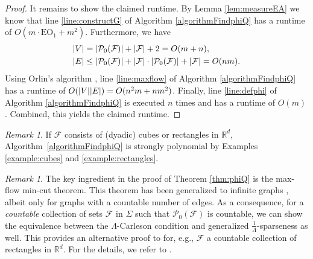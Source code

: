 \documentclass[a4paper, oneside,11pt]{amsart}
\theoremstyle{definition}
\theoremstyle{remark}
\newtheorem{remark}[theorem]{Remark}
\numberwithin{equation}{section}
\newcommand{\R}{\ensuremath{\mathbb{R}}}
\newcommand{\mc}{\mathcal}
\DeclarePairedDelimiter\abs{\lvert}{\rvert}
\begin{document}
\begin{proof}
It remains to show the claimed runtime. By Lemma \ref{lem:measureEA} we know that line \ref{line:constructG} of Algorithm \ref{algorithmFindphiQ} has a runtime of  $O(m\cdot \mathrm{EO}_1+ m^2)$. Furthermore, we have
\begin{align*}
  \abs{V} &= \abs{\mc{P}_0(\mc{F})} +\abs{\mc{F}}+2 = O(m+n),\\
  \abs{E} &\leq \abs{\mc{P}_0(\mc{F})} + \abs{\mc{F}}\cdot\abs{\mc{P}_0(\mc{F})} + \abs{\mc{F}} = O(nm).
\end{align*}
Using Orlin's algorithm \cite{Or13}, line \ref{line:maxflow} of Algorithm \ref{algorithmFindphiQ} has a runtime of $O(\abs{V}\abs{E}) = O(n^2m+nm^2)$. Finally, line \ref{line:defphi} of Algorithm \ref{algorithmFindphiQ} is executed $n$ times and has a runtime of $O(m)$. Combined, this yields the claimed runtime.
\end{proof}

\begin{remark}
  If $\mc{F}$ consists of (dyadic) cubes or rectangles in $\R^d$, Algorithm~\ref{algorithmFindphiQ} is strongly polynomial by Examples \ref{example:cubes} and \ref{example:rectangles}.
\end{remark}

\begin{remark}\label{rem:infinite}
The key ingredient in the proof of Theorem \ref{thm:phiQ} is the max-flow min-cut theorem. This theorem has been generalized to infinite graphs  \cite{ABGPS11,Loc22}, albeit only for graphs with a countable number of edges. As a consequence, for a \emph{countable} collection of sets $\mc{F}$ in $\Sigma$ such that $\mc{P}_0(\mc{F})$ is countable,  we can  show the equivalence between the $\Lambda$-Carleson condition and generalized $\frac1\Lambda$-sparseness as well. This provides an alternative proof to \cite{Haen18} for, e.g., $\mc{F}$ a countable collection of rectangles in $\R^d$. For the details, we refer to \cite[Chapter 4]{Hon24}.
\end{remark}
\end{document}
